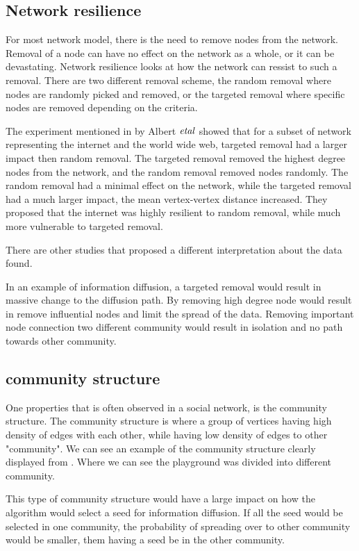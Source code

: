 \subsection{Network resilience}
For most network model, there is the need to remove nodes from the network. Removal of a node can have no effect on the network as a whole, or it can be devastating. Network resilience looks at how the network can ressist to such a removal. There are two different removal scheme, the random removal where nodes are randomly picked and removed, or the targeted removal where specific nodes are removed depending on the criteria. 

The experiment mentioned in \cite{complexNetwork} by Albert $\it{et al}$ showed that for a subset of network representing the internet and the world wide web, targeted removal had a larger impact then random removal. The targeted removal removed the highest degree nodes from the network, and the random removal removed nodes randomly. The random removal had a minimal effect on the network, while the targeted removal had a much larger impact, the mean vertex-vertex distance increased. They proposed that the internet was highly resilient to random removal, while much more vulnerable to targeted removal. 

There are other studies that proposed a different interpretation about the data found.	

In an example of information diffusion, a targeted removal would result in massive change to the diffusion path. By removing high degree node would result in remove influential nodes and limit the spread of the data. Removing important node connection two different community would result in isolation and no path towards other community.

\subsection{community structure}
One properties that is often observed in a social network, is the community structure. The community structure is where a group of vertices having high density of edges with each other, while having low density of edges to other "community". We can see an example of the community structure clearly displayed from \cite{RaceSchool2001}. Where we can see the playground was divided into different community.

This type of community structure would have a large impact on how the algorithm would select a seed for information diffusion. If all the seed would be selected in one community, the probability of spreading over to other community would be smaller, them having a seed be in the other community.

